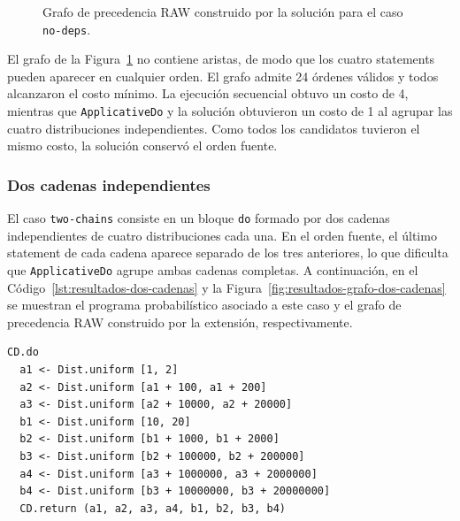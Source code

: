 \begin{figure}[ht]
\centering
\begin{PrecedenceGraph}
\end{PrecedenceGraph}
\caption[Grafo RAW del caso \texttt{no-deps}.]{Grafo de precedencia RAW construido por la solución para el caso \texttt{no-deps}.}
\label{fig:resultados-grafo-vacio}
\end{figure}

El grafo de la Figura~\ref{fig:resultados-grafo-vacio} no contiene aristas, de modo que los cuatro statements pueden aparecer en cualquier orden. El grafo admite 24 órdenes válidos y todos alcanzaron el costo mínimo. La ejecución secuencial obtuvo un costo de 4, mientras que \texttt{ApplicativeDo} y la solución obtuvieron un costo de 1 al agrupar las cuatro distribuciones independientes. Como todos los candidatos tuvieron el mismo costo, la solución conservó el orden fuente.

\subsubsection{Dos cadenas independientes}

El caso \texttt{two-chains} consiste en un bloque \texttt{do} formado por dos cadenas independientes de cuatro distribuciones cada una. En el orden fuente, el último statement de cada cadena aparece separado de los tres anteriores, lo que dificulta que \texttt{ApplicativeDo} agrupe ambas cadenas completas. A continuación, en el Código~\ref{lst:resultados-dos-cadenas} y la Figura~\ref{fig:resultados-grafo-dos-cadenas} se muestran el programa probabilístico asociado a este caso y el grafo de precedencia RAW construido por la extensión, respectivamente.

\begin{lstlisting}[style=haskell,caption={Programa probabilístico asociado al caso \texttt{two-chains}.},label={lst:resultados-dos-cadenas}]
CD.do
  a1 <- Dist.uniform [1, 2]
  a2 <- Dist.uniform [a1 + 100, a1 + 200]
  a3 <- Dist.uniform [a2 + 10000, a2 + 20000]
  b1 <- Dist.uniform [10, 20]
  b2 <- Dist.uniform [b1 + 1000, b1 + 2000]
  b3 <- Dist.uniform [b2 + 100000, b2 + 200000]
  a4 <- Dist.uniform [a3 + 1000000, a3 + 2000000]
  b4 <- Dist.uniform [b3 + 10000000, b3 + 20000000]
  CD.return (a1, a2, a3, a4, b1, b2, b3, b4)
\end{lstlisting}

